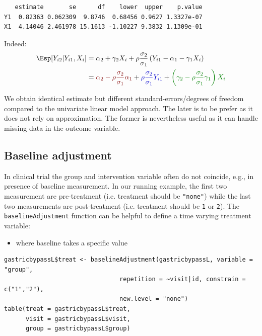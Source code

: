 \documentclass[12pt]{article}
\newcommand{\darkblue}{blue!80!black}
\newcommand{\darkgreen}{green!50!black}
\newcommand{\darkred}{red!50!black}
\begin{document}
\begin{verbatim}
   estimate       se      df    lower  upper    p.value
Y1  0.82363 0.062309  9.8746  0.68456 0.9627 1.3327e-07
X1  4.14046 2.461978 15.1613 -1.10227 9.3832 1.1309e-01
\end{verbatim}


Indeed:
\begin{align*}
\Esp[Y_{i2}|Y_{i1},X_{i}] &= \alpha_2 + \gamma_2 X_{i} + \rho \frac{\sigma_2}{\sigma_1}\left(Y_{i1} - \alpha_1 - \gamma_1 X_{i}\right) \\
                         &= \textcolor{\darkred}{\alpha_2 - \rho \frac{\sigma_2}{\sigma_1} \alpha_1}
                         + \textcolor{\darkblue}{\rho \frac{\sigma_2}{\sigma_1}Y_{i1}}
                         + \textcolor{\darkgreen}{\left(\gamma_2 - \rho \frac{\sigma_2}{\sigma_1} \gamma_1\right)  X_{i} }
\end{align*}

We obtain identical estimate but different standard-errors/degrees of
freedom compared to the univariate linear model approach. The later is
to be prefer as it does not rely on approximation. The former is
nevertheless useful as it can handle missing data in the outcome
variable.

\clearpage

\subsection{Baseline adjustment}
\label{sec:orgd0dd12a}

In clinical trial the group and intervention variable often do not
coincide, e.g., in presence of baseline measurement. In our running
example, the first two measurement are pre-treatment (i.e. treatment
should be \texttt{"none"}) while the last two measurements are post-treatment
(i.e. treatment should be \texttt{1} or \texttt{2}). The \texttt{baselineAdjustment}
function can be helpful to define a time varying treatment variable:
\begin{itemize}
\item where baseline takes a specific value
\end{itemize}
\lstset{language=r,label= ,caption= ,captionpos=b,numbers=none}
\begin{lstlisting}
gastricbypassL$treat <- baselineAdjustment(gastricbypassL, variable = "group",
                                repetition = ~visit|id, constrain = c("1","2"),
                                new.level = "none")
table(treat = gastricbypassL$treat,
      visit = gastricbypassL$visit,
      group = gastricbypassL$group)
\end{lstlisting}
\end{document}
